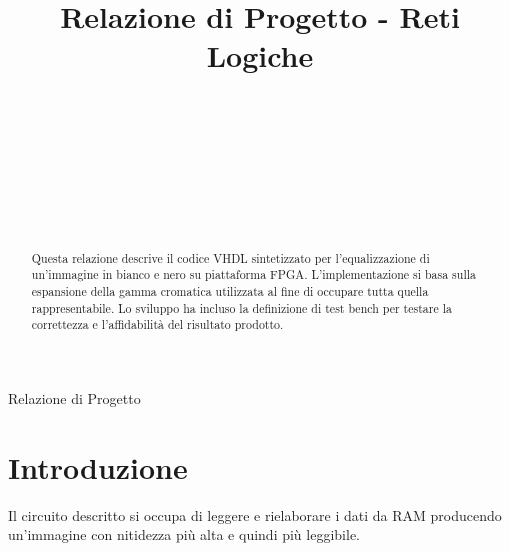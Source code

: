 \documentclass{article}
\begin{document}
\title{Relazione di Progetto - Reti Logiche%
%
}

\author{\\[2pt] 
\\
\\
\and
\\
\\
\\
}

%
%
{Relazione di Progetto} 

\maketitle

\begin{abstract}
Questa relazione descrive il codice VHDL sintetizzato per l'equalizzazione di un'immagine in bianco e nero su piattaforma FPGA. L'implementazione si basa sulla espansione della gamma cromatica utilizzata al fine di occupare tutta quella rappresentabile. Lo sviluppo ha incluso la definizione di test bench per testare la correttezza e l'affidabilità del risultato prodotto. 
\end{abstract}

\section{Introduzione}
\label{intro}
Il circuito descritto si occupa di leggere e rielaborare i dati da RAM producendo un'immagine con nitidezza più alta e quindi più leggibile. 
\end{document}

